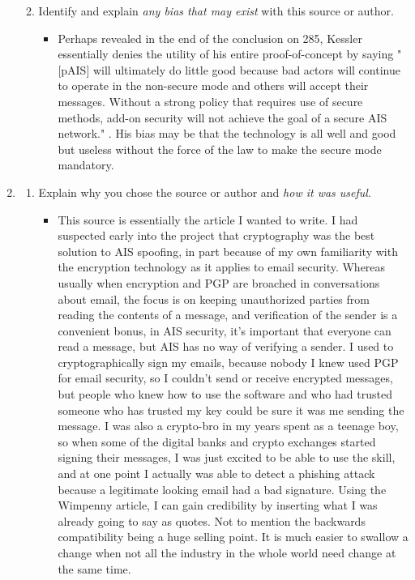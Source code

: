 \documentclass[12pt]{texMemo} %
\begin{document}
\begin{enumerate}
\begin{enumerate}
\begin{itemize}
        \end{itemize}
    \item Identify and explain \emph{any bias that may exist} with this source or author.
        \begin{itemize}
            \item Perhaps revealed in the end of the conclusion on 285, Kessler essentially denies the utility of his entire proof-of-concept by saying "[pAIS]  will ultimately do little good because bad actors will continue to operate in the non-secure mode and others will accept their messages. Without a strong policy that requires use of secure methods, add-on security will not achieve the goal of a secure AIS network." \autocite{kessler_protected_2020}. His bias may be that the technology is all well and good but useless without the force of the law to make the secure mode mandatory.
        \end{itemize}
\end{enumerate}
 \item {}
    \begin{enumerate}
    \item Explain why you chose the source or author and \emph{how it was useful}.
        \begin{itemize}
            \item This source is essentially the article I wanted to write. I had suspected early into the project that cryptography was the best solution to AIS spoofing, in part because of my own familiarity with the encryption technology as it applies to email security. Whereas usually when encryption and PGP are broached in conversations about email, the focus is on keeping unauthorized parties from reading the contents of a message, and verification of the sender is a convenient bonus, in AIS security, it's important that everyone can read a message, but AIS has no way of verifying a sender. I used to cryptographically sign my emails, because nobody I knew used PGP for email security, so I couldn't send or receive encrypted messages, but people who knew how to use the software and who had trusted someone who has trusted my key could be sure it was me sending the message. I was also a crypto-bro in my years spent as a teenage boy, so when some of the digital banks and crypto exchanges started signing their messages, I was just excited to be able to use the skill, and at one point I actually was able to detect a phishing attack because a legitimate looking email had a bad signature. Using the Wimpenny article, I can gain credibility by inserting what I was already going to say as quotes. Not to mention the backwards compatibility being a huge selling point. It is much easier to swallow a change when not all the industry in the whole world need change at the same time.

\end{itemize}
\end{enumerate}
\end{enumerate}
\end{document}
